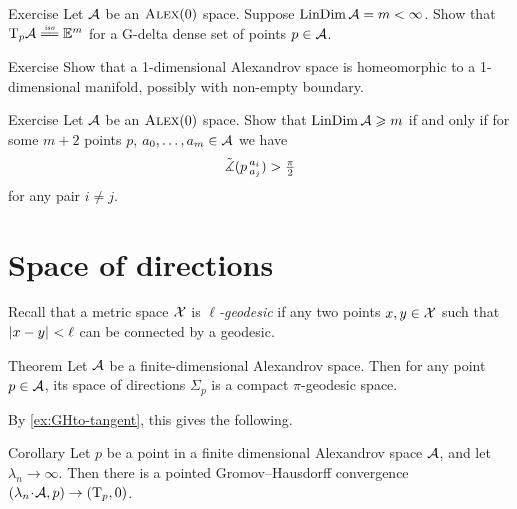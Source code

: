 \begin{thm}{Exercise}\label{ex:tangent=Em}
Let $\mathcal{A}$ be an $\textsc{Alex}(0)$ space.
Suppose $\mathop{\rm LinDim}\nolimits\mathcal{A}=m<\infty$.
Show that $\T_p\spc{A}\iso \EE^m$ for a G-delta dense set of points $p\in\mathcal{A}$.
\end{thm}

\begin{thm}{Exercise}\label{ex:dim=1}
Show that a 1-dimensional Alexandrov space is homeomorphic to a 1-dimensional manifold, possibly with non-empty boundary.
\end{thm}


\begin{thm}{Exercise}\label{ex:resporka}
Let $\mathcal{A}$ be an $\textsc{Alex}(0)$ space.
Show that $\mathop{\rm LinDim}\nolimits \mathcal{A}\geqslant m$ if and only if for some $m+2$ points $p$, $a_0,\dots, a_{m}\in \mathcal{A}$
we have
\[\tilde\measuredangle(p\,{}^{a_i}_{a_j})>\tfrac\pi2\]
for any pair $i\ne j$.
\end{thm}

\section{Space of directions}

Recall that a metric space $\mathcal{X}$ is \emph{$\ell$-geodesic}
if any two points $x,y\in\mathcal{X}$ such that $|{x}-{y}|_{}^{{}}<\ell$ can be connected by a geodesic.

\begin{thm}{Theorem}\label{thm:finite-space-of-directions}
Let $\mathcal{A}$ be a finite-dimensional Alexandrov space.
Then for any point $p\in \mathcal{A}$, its space of directions $\Sigma_p$ is a compact $\pi$-geodesic space.
\end{thm}

By \ref{ex:GHto-tangent}, this gives the following.

\begin{thm}{Corollary}\label{ex:GHto-tangent-finite-dim}
Let $p$ be a point in a finite dimensional Alexandrov space $\mathcal{A}$,
and let $\lambda_n\to\infty$.
Then there is a pointed Gromov--Hausdorff convergence $(\lambda_n\cdot \spc{A},p)\z\to (\T_p,0)$.
\end{thm}


